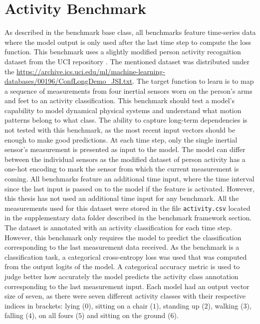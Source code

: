 \documentclass[draft,final]{vutinfth} %
\begin{document}
    \section{Activity Benchmark} \label{activity}
    As described in the benchmark base class, all benchmarks feature time-series data where the model output is only used after the last time step to compute the loss function.
    This benchmark uses a slightly modified person activity recognition dataset from the UCI repository \cite{UCI}.
    The mentioned dataset was distributed under the \url{https://archive.ics.uci.edu/ml/machine-learning-databases/00196/ConfLongDemo_JSI.txt}.
    The target function to learn is to map a sequence of measurements from four inertial sensors worn on the person's arms and feet to an activity classification.
    This benchmark should test a model's capability to model dynamical physical systems and understand what motion patterns belong to what class.
    The ability to capture long-term dependencies is not tested with this benchmark, as the most recent input vectors should be enough to make good predictions.
    At each time step, only the single inertial sensor's measurement is presented as input to the model.
    The model can differ between the individual sensors as the modified dataset of person activity has a one-hot encoding to mark the sensor from which the current measurement is coming.
    All benchmarks feature an additional time input, where the time interval since the last input is passed on to the model if the feature is activated.
    However, this thesis has not used an additional time input for any benchmark.
    All the measurements used for this dataset were stored in the file \texttt{activity.csv} located in the supplementary data folder described in the benchmark framework section.
    The dataset is annotated with an activity classification for each time step. However, this benchmark only requires the model to predict the classification corresponding to the last measurement data received.
    As the benchmark is a classification task, a categorical cross-entropy loss was used that was computed from the output logits of the model.
    A categorical accuracy metric is used to judge better how accurately the model predicts the activity class annotation corresponding to the last measurement input.
    Each model had an output vector size of seven, as there were seven different activity classes with their respective indices in brackets: lying ($0$), sitting on a chair ($1$), standing up ($2$), walking ($3$), falling ($4$), on all fours ($5$) and sitting on the ground ($6$).
\end{document}
